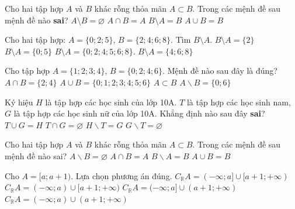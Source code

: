 \begin{ex}%
	Cho hai tập hợp $A$ và $B$ khác rỗng thỏa mãn $A \subset B$. Trong các mệnh đề sau mệnh đề nào  \textbf{sai}?
	\choice 
		 {$A \setminus B=\varnothing$}
		{$A \cap  B=A$}
		{\True $B \setminus  A=B$}
		{$A  \cup B=B$}
\end{ex}

\begin{ex}%
	Cho  hai tập hợp: $A=\{0;2;5\}$, $B=\{2;4;6;8\}$. Tìm $B\setminus A$.
	\choice 
		 {$B\setminus A=\{2\}$}
		{$B\setminus  A=\{0;5\}$}
		{$B\setminus  A=\{0;2;4;5;6;8\}$.}
		{\True $B\setminus A=\{4;6;8\}$} 
\end{ex}

\begin{ex}%
	Cho tập  hợp $A=\{1;2;3;4\}$, $B=\{0;2;4;6\}$. Mệnh đề nào sau đây là đúng?
	 \choice
		{\True $A\cap B=\{2;4\}$} 
		 {$A\cup B=\{0;1;2;3;4;5;6\}$}
		{$A\subset B$} 
		 {$A\backslash B=\{0;6\}$}
\end{ex}

\begin{ex}%
	Ký hiệu $H$ là tập hợp các học sinh của lớp 10A. $T$ là tập hợp các học sinh nam, $G$ là tập  hợp các học sinh nữ của lớp 10A. Khẳng định nào sau đây \textbf{sai}?
	 \choice
		{$T\cup  G=H$}
		{$T\cap  G=\varnothing$}
		{$H\backslash T=G$} 
		 {\True $G\backslash T=\varnothing$}
\end{ex}

\begin{ex}%
	 Cho hai tập hợp $A$ và $B$ khác rỗng thỏa mãn $A\subset B$. Trong các mệnh đề sau mệnh đề nào sai?
	\choice 
		 {$A\backslash B=\varnothing$}
		{$A\cap B=A$} 
		{$B\backslash A=B$} 
		 {\True $A\cup B=B$}
\end{ex}

\begin{ex}%
	Cho $A=[a; a+1)$.  Lựa chọn phương án đúng.
	 \choice
		{$C_{\mathbb{R}} A=(-\infty;  a] \cup[a+1;+\infty)$}
		{\True $C_{\mathbb{R}} A=(-\infty; a) \cup[a+1;+\infty)$} 
		 {$C_{\mathbb{R}} A=(-\infty; a] \cup(a+1;+\infty)$}
		{$C_{\mathbb{R}} A=(-\infty; a)  \cup(a+1;+\infty)$}
	\loigiai{ 
		Ta có $C_{\mathbb{R}} A=\mathbb{R} \setminus  A=(-\infty; a) \cup[a+1;+\infty)$.
	} 
\end{ex}

